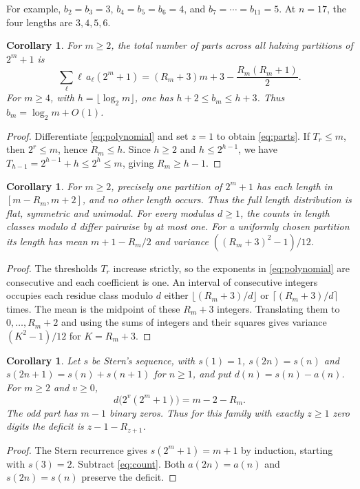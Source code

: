 \documentclass[11pt]{article}
\newtheorem{corollary}[theorem]{Corollary}
\begin{document}
For example, $b_2=b_3=3$, $b_4=b_5=b_6=4$, and
$b_7=\cdots=b_{11}=5$. At $n=17$, the four lengths are $3,4,5,6$.

\begin{corollary}\label{cor:consequences}
For $m\ge2$, the total number of parts across all halving partitions of
$2^m+1$ is
\begin{equation}\label{eq:parts}
 \sum_\ell\ell\,a_\ell(2^m+1)
 =(R_m+3)m+3-\frac{R_m(R_m+1)}2.
\end{equation}
For $m\ge4$, with $h=\lfloor\log_2m\rfloor$, one has
$h+2\le b_m\le h+3$. Thus $b_m=\log_2m+O(1)$.
\end{corollary}
\begin{proof}
Differentiate \eqref{eq:polynomial} and set $z=1$ to obtain
\eqref{eq:parts}. If $T_r\le m$, then $2^r\le m$, hence $R_m\le h$.
Since $h\ge2$ and $h\le2^{h-1}$, we have
$T_{h-1}=2^{h-1}+h\le2^h\le m$, giving $R_m\ge h-1$.
\end{proof}

\begin{corollary}\label{cor:flat}
For $m\ge2$, precisely one partition of $2^m+1$ has each length in
$[m-R_m,m+2]$, and no other length occurs. Thus the full length
distribution is flat, symmetric and unimodal. For every modulus $d\ge1$,
the counts in length classes modulo $d$ differ pairwise by at most one.
For a uniformly chosen
partition its length has mean $m+1-R_m/2$ and variance
$((R_m+3)^2-1)/12$.
\end{corollary}
\begin{proof}
The thresholds $T_r$ increase strictly, so the exponents in
\eqref{eq:polynomial} are consecutive and each coefficient is one.
An interval of consecutive integers occupies each residue class modulo
$d$ either $\lfloor(R_m+3)/d\rfloor$ or $\lceil(R_m+3)/d\rceil$ times.
The mean is the midpoint of these $R_m+3$ integers. Translating them
to $0,\ldots,R_m+2$ and using the sums of integers and their squares
gives variance $(K^2-1)/12$ for $K=R_m+3$.
\end{proof}

\begin{corollary}\label{cor:deficit}
Let $s$ be Stern's sequence, with $s(1)=1$, $s(2n)=s(n)$ and
$s(2n+1)=s(n)+s(n+1)$ for $n\ge1$, and put $d(n)=s(n)-a(n)$.
For $m\ge2$ and $v\ge0$,
\[
 d\bigl(2^v(2^m+1)\bigr)=m-2-R_m.
\]
The odd part has $m-1$ binary zeros. Thus for this family with exactly
$z\ge1$ zero digits the deficit is $z-1-R_{z+1}$.
\end{corollary}
\begin{proof}
The Stern recurrence gives $s(2^m+1)=m+1$ by induction, starting with
$s(3)=2$. Subtract \eqref{eq:count}. Both $a(2n)=a(n)$
\cite[Lemma~2]{alekseyev} and $s(2n)=s(n)$ preserve the deficit.
\end{proof}
\end{document}
